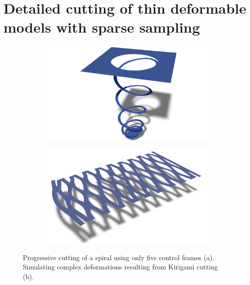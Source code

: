 \chapter{Detailed cutting of thin deformable models with sparse sampling}
\label{chap:cutting}

\begin{figure}[t]
\centering
\begin{subfigure}[b]{0.45\linewidth}
\includegraphics[width=\linewidth]{images/cutting-mig2015/Spiral2.pdf}
\caption{\label{fig:spiral}}
\end{subfigure}
\hfill
\begin{subfigure}[b]{0.45\linewidth}
\includegraphics[width=\linewidth]{images/cutting-mig2015/Kirigami.pdf}
\caption{\label{fig:kirigami}}
\end{subfigure}
\caption[Frame-based cutting: Spiral and Kirigami cutting examples]{\label{fig:teaser} Progressive cutting of a spiral using only five control frames (a). Simulating complex deformations resulting from Kirigami cutting (b).}
\end{figure}


